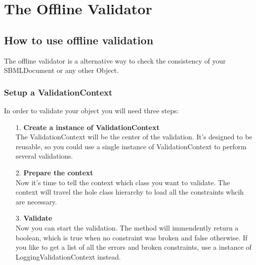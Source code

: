 \section[Offline Validation]{The Offline Validator}
\subsection{How to use offline validation}

The offline validator is a alternative way to check the consistency of your SBMLDocument or any other Object.
\subsubsection{Setup a ValidationContext}
In order to validate your object you will need three steps:
\begin{itemize}
\item[1.] \textbf{Create a instance of ValidationContext} \\
The ValidationContext will be the center of the validation. It's designed to be reusable, so you could use a single instance of ValidationContext to perform several validations.
\item[2.] \textbf{Prepare the context} \\
Now it's time to tell the context which class you want to validate. The context will travel the hole class hierarchy to load all the constraints whcih are necessary.
\item[3.] \textbf{Validate} \\
Now you can start the validation. The method will immendently return a boolean, which is true when no constraint was broken and false otherwise. If you like to get a list of all the errors and broken constraints, use a instance of LoggingValidationContext instead.
\end{itemize}


